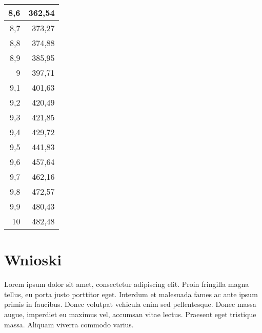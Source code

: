 \documentclass{article}
\begin{document}
\begin{center}
\begin{longtable}{|r|r|}
8,6                                & 362,54                             \\ \hline
8,7                                & 373,27                             \\ \hline
8,8                                & 374,88                             \\ \hline
8,9                                & 385,95                             \\ \hline
9                                  & 397,71                             \\ \hline
9,1                                & 401,63                             \\ \hline
9,2                                & 420,49                             \\ \hline
9,3                                & 421,85                             \\ \hline
9,4                                & 429,72                             \\ \hline
9,5                                & 441,83                             \\ \hline
9,6                                & 457,64                             \\ \hline
9,7                                & 462,16                             \\ \hline
9,8                                & 472,57                             \\ \hline
9,9                                & 480,43                             \\ \hline
10                                 & 482,48                             \\ \hline
\end{longtable}
\end{center}



\section{Wnioski}

Lorem ipsum dolor sit amet, consectetur adipiscing elit. Proin fringilla magna tellus, eu porta justo porttitor eget. Interdum et malesuada fames ac ante ipsum primis in faucibus. Donec volutpat vehicula enim sed pellentesque. Donec massa augue, imperdiet eu maximus vel, accumsan vitae lectus. Praesent eget tristique massa. Aliquam viverra commodo varius. 
\end{document}
